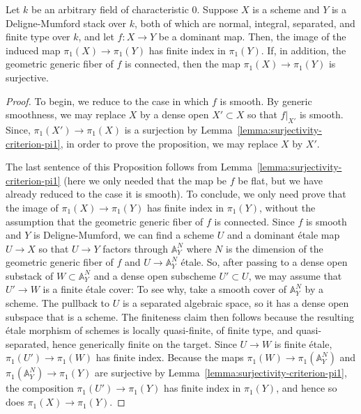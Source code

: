 \begin{proposition} \label{proposition:stacky-dominant-map-surjective-fundamental-group}
Let $k$ be an arbitrary field of characteristic $0$. Suppose $X$ is a scheme and $Y$ is a Deligne-Mumford stack over $k$, both of which are normal, integral, separated, and finite type over $k$, and let $f\colon X \rightarrow Y$ be a dominant map.
Then, the image of the induced map
       $\pi_1(X) \rightarrow \pi_1(Y)$ has finite index in $\pi_1(Y)$. If, in addition, the geometric
       generic fiber of $f$ is connected, then the map $\pi_1(X) \rightarrow \pi_1(Y)$ is surjective.
\end{proposition}
\begin{proof}
To begin, we reduce to the case in which $f$ is smooth.
By generic smoothness, we may replace $X$
by a dense open $X' \subset X$ so that $f|_{X'}$ is smooth.
Since, $\pi_1(X') \rightarrow \pi_1(X)$ is a surjection by Lemma~\ref{lemma:surjectivity-criterion-pi1}, in order to prove the proposition, we may replace $X$ by $X'$.

The last sentence of this Proposition follows from Lemma~\ref{lemma:surjectivity-criterion-pi1} (here we only needed that the map be $f$ be flat, but we have already reduced to the case it is smooth). To conclude, we only need prove that the image of $\pi_1(X)\rightarrow \pi_1(Y)$ has finite index in $\pi_1(Y)$, without the assumption that the geometric generic fiber of $f$ is connected. Since $f$ is smooth and $Y$ is Deligne-Mumford, we can find a scheme $U$ and a dominant \'etale map $U \rightarrow X$ so that $U \rightarrow Y$ factors through $\mathbb A^N_Y$ where $N$ is the dimension of the geometric generic fiber of $f$ and $U \rightarrow \mathbb A^N_Y$ \'etale.
So, after passing to a dense open substack of $W \subset \mathbb A^N_Y$ and a dense open subscheme $U' \subset U$, we may assume that $U' \rightarrow W$ is a finite \'etale cover:
To see why, take a smooth cover of $\mathbb A^N_Y$ by a scheme. The pullback to $U$ is a separated algebraic space, so it has a dense open subspace that is a scheme. The finiteness claim then follows because the resulting \'etale morphism of schemes is locally quasi-finite, of finite type, and quasi-separated, hence generically finite on the target.
Since $U \rightarrow W$ is finite \'etale, $\pi_1(U') \rightarrow \pi_1(W)$ has finite index.
Because the maps $\pi_1(W) \rightarrow \pi_1(\mathbb A^N_Y)$ and $\pi_1(\mathbb A^N_Y) \rightarrow \pi_1(Y)$ are surjective by Lemma~\ref{lemma:surjectivity-criterion-pi1}, the composition $\pi_1(U') \rightarrow \pi_1(Y)$ has finite index in $\pi_1(Y)$, and hence so does $\pi_1(X) \rightarrow \pi_1(Y)$.
\end{proof}

